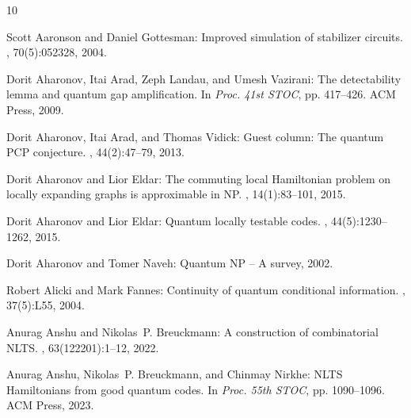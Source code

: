 \documentclass[11pt]{article}
\begin{document}
\tocrefpdfbookmark
\begin{thebibliography}{10}

{\sc Scott Aaronson and Daniel Gottesman}: Improved simulation of stabilizer
  circuits.
, 70(5):052328, 2004.

{\sc Dorit Aharonov, Itai Arad, Zeph Landau, and Umesh Vazirani}: The
  detectability lemma and quantum gap amplification.
\newblock In {\em Proc. 41st STOC}, pp. 417--426. ACM Press, 2009.
\newblock [\epfmtdoi{10.1145/1536414.1536472}]

{\sc Dorit Aharonov, Itai Arad, and Thomas Vidick}: Guest column: The quantum
  {PCP} conjecture.
, 44(2):47--79, 2013.
\newblock [\epfmtdoi{10.1145/2491533.2491549}]

{\sc Dorit Aharonov and Lior Eldar}: The commuting local {H}amiltonian problem
  on locally expanding graphs is approximable in {NP}.
, 14(1):83--101, 2015.
\newblock [\epfmtdoi{10.1007/s11128-014-0877-9}]

{\sc Dorit Aharonov and Lior Eldar}: Quantum locally testable codes.
, 44(5):1230--1262, 2015.
\newblock [\epfmtdoi{10.1137/140975498}]

{\sc Dorit Aharonov and Tomer Naveh}: Quantum {NP} -- {A} survey, 2002.

{\sc Robert Alicki and Mark Fannes}: Continuity of quantum conditional
  information.
, 37(5):L55, 2004.
\newblock [\epfmtdoi{10.1088/0305-4470/37/5/L01}]

{\sc Anurag Anshu and Nikolas~P. Breuckmann}: A construction of combinatorial
  {NLTS}.
, 63(122201):1--12, 2022.

{\sc Anurag Anshu, Nikolas~P. Breuckmann, and Chinmay Nirkhe}: {NLTS
  Hamiltonians} from good quantum codes.
\newblock In {\em Proc. 55th STOC}, pp. 1090--1096. ACM Press, 2023.


\end{thebibliography}
\end{document}
